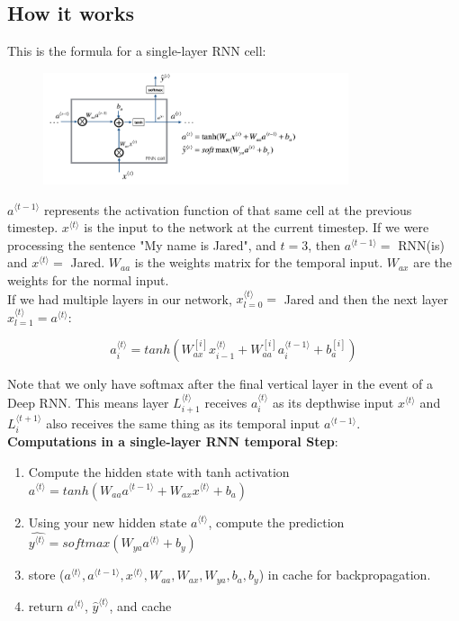 \documentclass[12pt]{article}
\begin{document}
\subsection{How it works}

This is the formula for a single-layer RNN cell:

\begin{figure}[H]
    \centering
    \includegraphics[width=0.8\textwidth]{./RNN_cell.png} %
\end{figure}

\(a^{\langle t-1\rangle}\) represents the activation function of that same cell at the previous timestep. \(x^{\langle t\rangle}\) is the input to the network at the current timestep. If we were processing the sentence "My name is Jared", and \(t=3\), then \(a^{\langle t-1\rangle} = \) RNN(is) and \(x^{\langle t\rangle} = \) Jared. \(W_{aa}\) is the weights matrix for the temporal input. \(W_{ax}\) are the weights for the normal input. \\

If we had multiple layers in our network, \(x_{l=0}^{\langle t\rangle} = \) Jared and then the next layer \(x_{l=1}^{\langle t\rangle} = a^{\langle t\rangle}\):

\[a_i^{\langle t \rangle} = tanh(W_{ax}^{[i]}x_{i-1}^{\langle t \rangle} + W_{aa}^{[i]}a_i^{\langle t-1 \rangle} + b_a^{[i]})\]

 Note that we only have softmax after the final vertical layer in the event of a Deep RNN. This means layer \(L_{i+1}^{\langle t \rangle}\) receives \(a_i^{\langle t \rangle}\) as its depthwise input \(x^{\langle t\rangle}\) and \(L_{i}^{\langle t+1 \rangle}\) also receives the same thing as its temporal input \(a^{\langle t- 1\rangle}\).\\

\textbf{Computations in a single-layer RNN temporal Step}:
\begin{enumerate}
\item Compute the hidden state with tanh activation \(a^{\langle t\rangle} = tanh(W_{aa}a^{\langle t-1\rangle} + W_{ax}x^{\langle t\rangle} + b_a)\)
\item Using your new hidden state \(a^{\langle t\rangle}\), compute the prediction \(\hat{y^{\langle t \rangle}} = softmax(W_{ya}a^{\langle t\rangle} + b_y)\)
\item store (\(a^{\langle t\rangle}, a^{\langle t-1\rangle}, x^{\langle t\rangle}, W_{aa}, W_{ax}, W_{ya}, b_a, b_y\)) in cache for backpropagation.
\item return \(a^{\langle t\rangle}\), \(\hat{y}^{\langle t \rangle}\), and cache
\end{enumerate}
\end{document}
